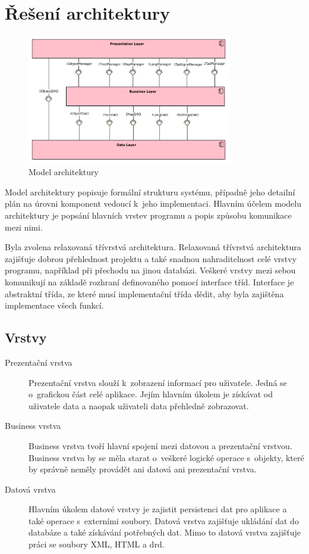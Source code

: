 \documentclass[thesis=B,czech]{resources/FITthesis}[2012/06/26]
\begin{document}
	\section{Řešení architektury}
\begin{figure}\centering
	\includegraphics[width=0.8\textwidth]{images/architektura}
	\caption[Model architektury]{Model architektury}\label{fig:architektura}
\end{figure}
Model architektury popisuje formální strukturu systému, případně jeho detailní plán na úrovni komponent vedoucí k~jeho implementaci. Hlavním účelem modelu architektury je popsání hlavních vrstev programu a popis způsobu komunikace mezi nimi.\par

Byla zvolena relaxovaná třívrstvá architektura. Relaxovaná třívrstvá architektura zajišťuje dobrou přehlednost projektu a také snadnou nahraditelnost celé vrstvy programu, například při přechodu na jinou databázi. Veškeré vrstvy mezi sebou komunikují na základě rozhraní definovaného pomocí interface tříd. Interface je abstraktní třída, ze které musí implementační třída dědit, aby byla zajištěna implementace všech funkcí.

\subsection{Vrstvy}
\begin{description}
	\item[Prezentační vrstva] Prezentační vrstva slouží k~zobrazení informací pro uživatele. Jedná se o~grafickou část celé aplikace. Jejím hlavním úkolem je získávat od uživatele data a naopak uživateli data přehledně zobrazovat. 
	
	\item[Business vrstva] Business vrstva tvoří hlavní spojení mezi datovou a prezentační vrstvou. Business vrstva by se měla starat o~veškeré logické operace s~objekty, které by správně neměly provádět ani datová ani prezentační vrstva.
	
	\item[Datová vrstva] Hlavním úkolem datové vrstvy je zajistit persistenci dat pro aplikace a také operace s~externími soubory. Datová vrstva zajišťuje ukládání dat do databáze a také získávání potřebných dat. Mimo to datová vrstva zajišťuje práci se soubory XML, HTML a drd. 
	
\end{description}
\end{document}
